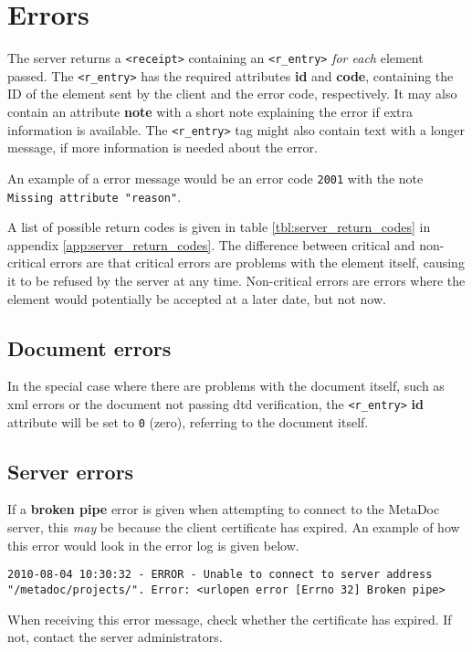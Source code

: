 \newpage
\section{Errors}
\label{sec:errors}

The server returns a \texttt{<receipt>} containing an \texttt{<r\_entry>}
\textit{for each} element passed. The \texttt{<r\_entry>} has the required
attributes \textbf{id} and \textbf{code}, containing the ID of the element sent
by the client and the error code, respectively. It may also contain an
attribute \textbf{note} with a short note explaining the error if extra
information is available. The \texttt{<r\_entry>} tag might also contain text
with a longer message, if more information is needed about the error. 

An example of a error message would be an error code \texttt{2001} with the
note \texttt{Missing attribute "reason"}.

A list of possible return codes is given in table \ref{tbl:server_return_codes}
in appendix \ref{app:server_return_codes}. The difference between critical and
non-critical errors are that critical errors are problems with the element
itself, causing it to be refused by the server at any time. Non-critical errors
are errors where the element would potentially be accepted at a later date, but
not now.

\subsection{Document errors}

In the special case where there are problems with the document itself, such as
\gls{xml} errors or the document not passing \gls{dtd} verification, the
\texttt{<r\_entry>} \textbf{id} attribute will be set to \texttt{0} (zero),
referring to the document itself. 

\subsection{Server errors}

If a \textbf{broken pipe} error is given when attempting to connect to the
MetaDoc server, this \textit{may} be because the client certificate has
expired. An example of how this error would look in the error log is given
below.

\begin{verbatim}
2010-08-04 10:30:32 - ERROR - Unable to connect to server address
"/metadoc/projects/". Error: <urlopen error [Errno 32] Broken pipe>
\end{verbatim}

When receiving this error message, check whether the certificate has expired.
If not, contact the server administrators.
